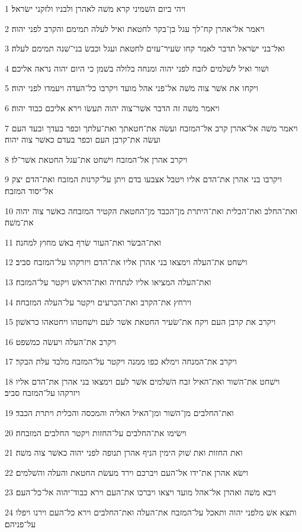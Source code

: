 \par 1 ויהי ביום השׁמיני קרא משׁה לאהרן ולבניו ולזקני ישׂראל׃
\par 2 ויאמר אל־אהרן קח־לך עגל בן־בקר לחטאת ואיל לעלה תמימם והקרב לפני יהוה׃
\par 3 ואל־בני ישׂראל תדבר לאמר קחו שׂעיר־עזים לחטאת ועגל וכבשׂ בני־שׁנה תמימם לעלה׃
\par 4 ושׁור ואיל לשׁלמים לזבח לפני יהוה ומנחה בלולה בשׁמן כי היום יהוה נראה אליכם׃
\par 5 ויקחו את אשׁר צוה משׁה אל־פני אהל מועד ויקרבו כל־העדה ויעמדו לפני יהוה׃
\par 6 ויאמר משׁה זה הדבר אשׁר־צוה יהוה תעשׂו וירא אליכם כבוד יהוה׃
\par 7 ויאמר משׁה אל־אהרן קרב אל־המזבח ועשׂה את־חטאתך ואת־עלתך וכפר בעדך ובעד העם ועשׂה את־קרבן העם וכפר בעדם כאשׁר צוה יהוה׃
\par 8 ויקרב אהרן אל־המזבח וישׁחט את־עגל החטאת אשׁר־לו׃
\par 9 ויקרבו בני אהרן את־הדם אליו ויטבל אצבעו בדם ויתן על־קרנות המזבח ואת־הדם יצק אל־יסוד המזבח׃
\par 10 ואת־החלב ואת־הכלית ואת־היתרת מן־הכבד מן־החטאת הקטיר המזבחה כאשׁר צוה יהוה את־משׁה׃
\par 11 ואת־הבשׂר ואת־העור שׂרף באשׁ מחוץ למחנה׃
\par 12 וישׁחט את־העלה וימצאו בני אהרן אליו את־הדם ויזרקהו על־המזבח סביב׃
\par 13 ואת־העלה המציאו אליו לנתחיה ואת־הראשׁ ויקטר על־המזבח׃
\par 14 וירחץ את־הקרב ואת־הכרעים ויקטר על־העלה המזבחה׃
\par 15 ויקרב את קרבן העם ויקח את־שׂעיר החטאת אשׁר לעם וישׁחטהו ויחטאהו כראשׁון׃
\par 16 ויקרב את־העלה ויעשׂה כמשׁפט׃
\par 17 ויקרב את־המנחה וימלא כפו ממנה ויקטר על־המזבח מלבד עלת הבקר׃
\par 18 וישׁחט את־השׁור ואת־האיל זבח השׁלמים אשׁר לעם וימצאו בני אהרן את־הדם אליו ויזרקהו על־המזבח סביב׃
\par 19 ואת־החלבים מן־השׁור ומן־האיל האליה והמכסה והכלית ויתרת הכבד׃
\par 20 וישׂימו את־החלבים על־החזות ויקטר החלבים המזבחה׃
\par 21 ואת החזות ואת שׁוק הימין הניף אהרן תנופה לפני יהוה כאשׁר צוה משׁה׃
\par 22 וישׂא אהרן את־ידו אל־העם ויברכם וירד מעשׂת החטאת והעלה והשׁלמים׃
\par 23 ויבא משׁה ואהרן אל־אהל מועד ויצאו ויברכו את־העם וירא כבוד־יהוה אל־כל־העם׃
\par 24 ותצא אשׁ מלפני יהוה ותאכל על־המזבח את־העלה ואת־החלבים וירא כל־העם וירנו ויפלו על־פניהם׃

